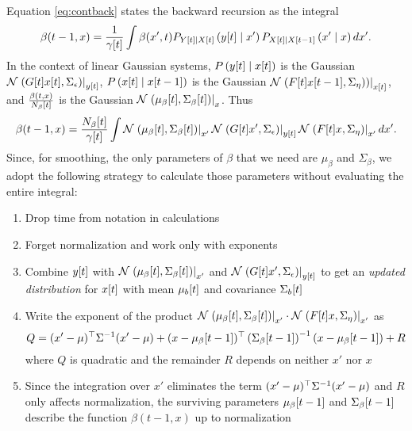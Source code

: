 Equation \eqref{eq:contback} states the backward recursion as the
integral
\begin{equation*}
  \beta(t-1,x) =  
  \frac{1}{{\gamma}{[t]}} \int\beta(x',t)
  P_{{Y}{[t]}\mid {X}{[t]}}\left({y}{[t]}\mid x' \right)
  P_{{X}{[t]}\mid {X}{[t-1]}}\left(x'\mid x \right) dx'.
\end{equation*}
In the context of linear Gaussian systems, $P
\left({y}{[t]}\mid {x}{[t]} \right)$ is the Gaussian
${\mathcal{N}}\left.\left({G}{[t]}{x}{[t]},\Sigma_\epsilon\right)\right|_{{y}{[t]}}$, $P
\left({x}{[t]}\mid {x}{[t-1]}\right) $ is the Gaussian $
{\mathcal{N}}\left.\left({F}{[t]} {x}{[t-1]},\Sigma_\eta)\right)\right|_{{x}{[t]}}$, and
$\frac{\beta(t,x)}{{N_\beta}{[t]}} $ is the Gaussian $
{\mathcal{N}}\left.\left({\mu_\beta}{[t]},{\Sigma_\beta}{[t]}\right)\right|_{x}$.  Thus
\begin{equation*}
  \beta(t-1,x) =  
  \frac{{N_\beta}{[t]}}{{\gamma}{[t]}} \int
  {\mathcal{N}}\left.\left({\mu_\beta}{[t]},{\Sigma_\beta}{[t]}\right)\right|_{x'}
  {\mathcal{N}}\left.\left({G}{[t]}x',\Sigma_\epsilon\right)\right|_{{y}{[t]}}
  {\mathcal{N}}\left.\left({F}{[t]}x,\Sigma_\eta\right)\right|_{x'}   dx'.
\end{equation*}
Since, for smoothing, the only parameters of $\beta$ that we need are
$\mu_\beta$ and $\Sigma_\beta$, we adopt the following strategy to
calculate those parameters without evaluating the entire integral:
\begin{enumerate}
\item \label{BackList1} Drop time from notation in calculations
\item \label{BackList2} Forget normalization and work only with exponents
\item \label{BackList3} Combine ${y}{[t]}$ with
  ${\mathcal{N}}\left.\left({\mu_\beta}{[t]},{\Sigma_\beta}{[t]}\right)\right|_{x'}$ and
  ${\mathcal{N}}\left.\left({G}{[t]}x',\Sigma_\epsilon\right)\right|_{{y}{[t]}}$ to get an
  \emph{updated distribution} for ${x}{[t]}$ with mean
  ${\mu_b}{[t]}$ and covariance ${\Sigma_b}{[t]}$
\item \label{BackList4} Write the exponent of the product
  ${\mathcal{N}}\left.\left({\mu_\beta}{[t]},{\Sigma_\beta}{[t]}\right)\right|_{x'} \cdot
  {\mathcal{N}}\left.\left({F}{[t]}x,\Sigma_\eta\right)\right|_{x'}$ as
  \begin{equation*}
    Q = (x' - \mu)^\top \Sigma^{-1} (x' - \mu) +
    (x - {\mu_\beta}{[t-1]})^\top \left({\Sigma_\beta}{[t-1]}
    \right)^{-1}(x - {\mu_\beta}{[t-1]}) + R
  \end{equation*}
  where $Q$ is quadratic and the remainder $R$ depends on neither $x'$
  nor $x$
\item \label{BackList5} Since the integration over $x'$ eliminates the
  term $(x' - \mu)^\top \Sigma^{-1} (x' - \mu)$ and $R$ only
  affects normalization, the surviving parameters
  ${\mu_\beta}{[t-1]}$ and ${\Sigma_\beta}{[t-1]}$ describe the
  function $\beta(t-1,x)$ up to normalization
\end{enumerate}

